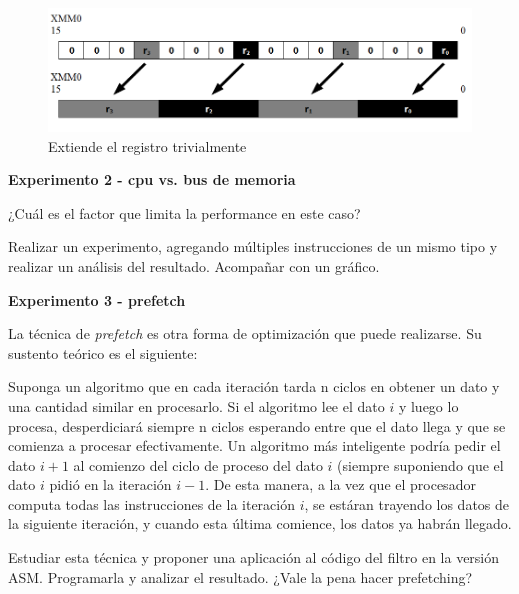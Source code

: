\begin{figure}[h]
  \begin{center}
  \includegraphics[scale=0.66]{imagenes/popart-extiende-r.png}
  \caption{Extiende el registro trivialmente}
  \label{fig:popart_extiende_r}
  \end{center}
\end{figure}



\clearpage

\vspace*{0.3cm} \noindent
\textbf{Experimento 2 - cpu vs. bus de memoria}

	¿Cuál es el factor que limita la performance en este caso? 
	
	Realizar un experimento, agregando múltiples instrucciones de un mismo tipo
	y realizar un análisis 	del resultado. Acompañar con un gráfico.


\vspace*{0.3cm} \noindent
\textbf{Experimento 3 - prefetch}

  La técnica de \textit{prefetch} es otra forma de optimización que puede
  realizarse. Su sustento teórico es el siguiente:
  
  Suponga un algoritmo que en cada iteración tarda n ciclos en obtener un dato y una cantidad
  similar en procesarlo. Si el algoritmo lee el dato $i$ y luego lo procesa,
  desperdiciará siempre n ciclos esperando entre que el dato llega y que se comienza
  a procesar efectivamente. Un algoritmo más inteligente podría pedir el 
  dato $i+1$ al comienzo del ciclo de proceso del dato $i$ (siempre suponiendo
  que el dato $i$ pidió en la iteración $i-1$. De esta manera, a la vez que el
  procesador computa todas las instrucciones de la iteración $i$, se estáran trayendo
  los datos de la siguiente iteración, y cuando esta última comience, los datos ya
  habrán llegado.

  \vspace*{0.2cm}
  Estudiar esta técnica y proponer una aplicación al código del filtro en la versión ASM.
  Programarla y analizar el resultado. ¿Vale la pena hacer prefetching?

